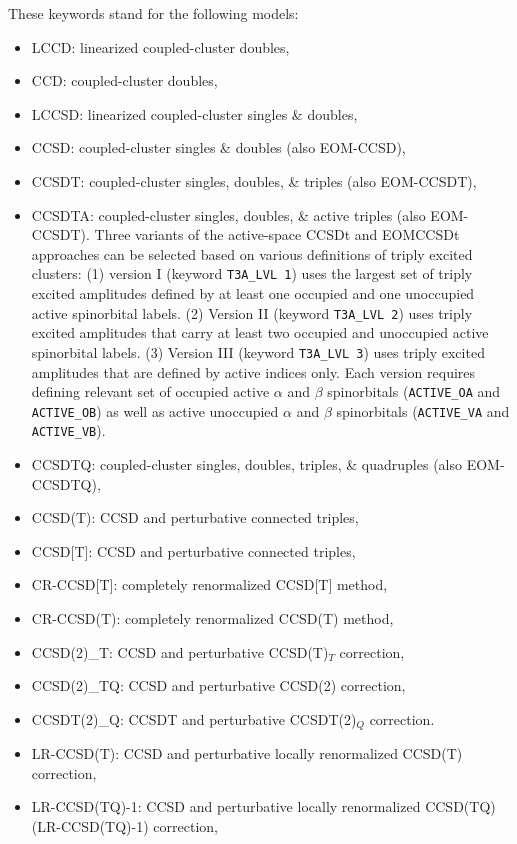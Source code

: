 These keywords stand for the following models:
\begin{itemize}
\item LCCD: linearized coupled-cluster doubles,
\item CCD: coupled-cluster doubles,
\item LCCSD: linearized coupled-cluster singles \& doubles,
\item CCSD: coupled-cluster singles \& doubles (also EOM-CCSD),
\item CCSDT: coupled-cluster singles, doubles, \& triples (also EOM-CCSDT),
\item CCSDTA: coupled-cluster singles, doubles, \& active triples (also EOM-CCSDT).
Three variants of the active-space CCSDt and EOMCCSDt approaches can be selected based on 
various definitions of triply excited clusters: (1) version I (keyword {\tt T3A\_LVL  1}) uses
the largest set of triply excited amplitudes defined by at least one occupied and one unoccupied 
active spinorbital labels. (2) Version II (keyword {\tt T3A\_LVL  2}) uses
triply excited amplitudes that carry at least two occupied and unoccupied
active spinorbital labels. (3) Version III (keyword {\tt T3A\_LVL  3}) uses
triply excited amplitudes that are defined by active indices only.
Each version requires defining relevant set of occupied active $\alpha$ and $\beta$ spinorbitals
({\tt ACTIVE\_OA} and {\tt ACTIVE\_OB}) as well as active unoccupied $\alpha$ and $\beta$ spinorbitals
({\tt ACTIVE\_VA} and {\tt ACTIVE\_VB}).
\item CCSDTQ: coupled-cluster singles, doubles, triples, \& quadruples (also EOM-CCSDTQ),
\item CCSD(T): CCSD and perturbative connected triples,
\item CCSD[T]: CCSD and perturbative connected triples,
\item CR-CCSD[T]: completely renormalized CCSD[T] method,
\item CR-CCSD(T): completely renormalized CCSD(T) method,
\item CCSD(2)\_T: CCSD and perturbative CCSD(T)$_T$ correction,
\item CCSD(2)\_TQ: CCSD and  perturbative CCSD(2) correction,
\item CCSDT(2)\_Q: CCSDT and perturbative CCSDT(2)$_Q$ correction.
\item LR-CCSD(T): CCSD and perturbative locally renormalized CCSD(T) correction,
\item LR-CCSD(TQ)-1: CCSD and perturbative locally renormalized CCSD(TQ) (LR-CCSD(TQ)-1) correction,

\end{itemize}
